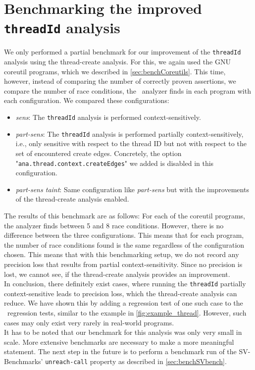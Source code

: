   \section{Benchmarking the improved \texttt{threadId} analysis}
    We only performed a partial benchmark for our improvement of the \texttt{threadId} analysis using the thread-create analysis. For this, we again used the GNU coreutil programs, which we described in \autoref{sec:benchCoreutils}. This time, however, instead of comparing the number of correctly proven assertions, we compare the number of race conditions, the \gob\ analyzer finds in each program with each configuration. We compared these configurations:
    \begin{itemize}
      \item \textit{sens}: The \texttt{threadId} analysis is performed context-sensitively.
      \item \textit{part-sens}: The \texttt{threadId} analysis is performed partially context-sensitively, i.e., only sensitive with respect to the thread ID but not with respect to the set of encountered create edges. Concretely, the option "\texttt{ana.thread.context.createEdges}" we added is disabled in this configuration.
      \item \textit{part-sens taint}: Same configuration like \textit{part-sens} but with the improvements of the thread-create analysis enabled.
    \end{itemize}
    The results of this benchmark are as follows: For each of the coreutil programs, the analyzer finds between 5 and 8 race conditions. However, there is no difference between the three configurations. This means that for each program, the number of race conditions found is the same regardless of the configuration chosen. This means that with this benchmarking setup, we do not record any precision loss that results from partial context-sensitivity. Since no precision is lost, we cannot see, if the thread-create analysis provides an improvement.
    \\
    In conclusion, there definitely exist cases, where running the \texttt{threadId} partially context-sensitive leads to precision loss, which the thread-create analysis can reduce. We have shown this by adding a regression test of one such case to the \gob\ regression tests, similar to the example in \autoref{fig:example_thread}. However, such cases may only exist very rarely in real-world programs.\\
    It has to be noted that our benchmark for this analysis was only very small in scale. More extensive benchmarks are necessary to make a more meaningful statement. The next step in the future is to perform a benchmark run of the SV-Benchmarks' \texttt{unreach-call} property as described in \autoref{sec:benchSVbench}.
